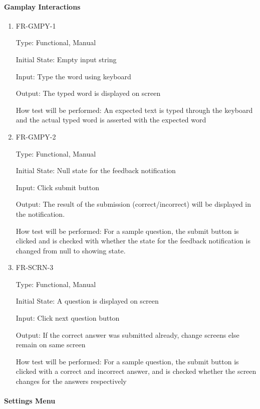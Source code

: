 \documentclass[12pt, titlepage]{article}
\begin{document}
\paragraph{Gamplay Interactions}
\begin{enumerate}	
	\item{FR-GMPY-1\\}
	
	Type: Functional, Manual
	
	Initial State: Empty input string
	
	Input:  Type the word using keyboard
	
	Output:  The typed word is displayed on screen
	
	How test will be performed: An expected text is typed through the keyboard and the actual typed word is asserted with the expected word
	
	
	\item{FR-GMPY-2\\}
	
	Type: Functional, Manual
	
	Initial State: Null state for the feedback notification
	
	Input: Click submit button 
	
	Output: The result of the submission (correct/incorrect) will be displayed in the notification.
	
	How test will be performed: For a sample question, the submit button is clicked and is checked with whether the state for the feedback notification is changed from null to showing state.
	
	\item{FR-SCRN-3\\}
	
	Type: Functional, Manual
	
	Initial State: A question is displayed on screen
	
	Input: Click next question button
	
	Output: If the correct answer was submitted already, change screens else remain on same screen
	
	How test will be performed: For a sample question, the submit button is clicked with a correct and incorrect answer, and is checked whether the screen changes for the answers respectively	
\end{enumerate}

\paragraph{Settings Menu}
\end{document}
